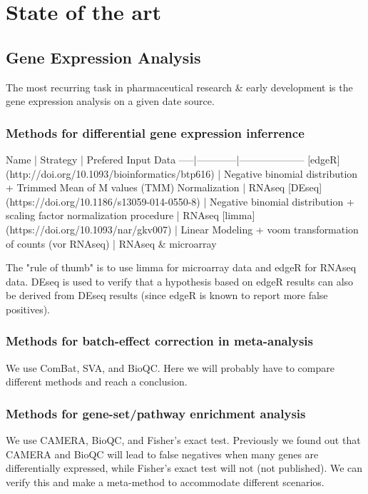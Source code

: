 
\chapter{State of the art}
\label{ch:sota}

\section{Gene Expression Analysis}

The most recurring task in pharmaceutical research \& early development is the gene expression analysis on a given date source. 

\subsection{Methods for differential gene expression inferrence}



Name | Strategy | Prefered Input Data
-----|------------|--------------------
[edgeR](http://doi.org/10.1093/bioinformatics/btp616) | Negative binomial distribution + Trimmed Mean of M values (TMM) Normalization | RNAseq
[DEseq](https://doi.org/10.1186/s13059-014-0550-8) | Negative binomial distribution + scaling factor normalization procedure | RNAseq
[limma](https://doi.org/10.1093/nar/gkv007) | Linear Modeling + voom transformation of counts (vor RNAseq) | RNAseq \& microarray

The "rule of thumb" is to use limma for microarray data and edgeR for RNAseq data. DEseq is used to verify that a hypothesis based on edgeR results can also be derived from DEseq results (since edgeR is known to report more false positives).

\subsection{Methods for batch-effect correction in meta-analysis}

We use ComBat, SVA, and BioQC. Here we will probably have to compare different methods and reach a conclusion.

\subsection{Methods for gene-set/pathway enrichment analysis}

We use CAMERA, BioQC, and Fisher's exact test.
Previously we found out that CAMERA and BioQC will lead to false negatives when many genes are differentially expressed, while Fisher's exact test will not (not published). We can verify this and make a meta-method to accommodate different scenarios.

